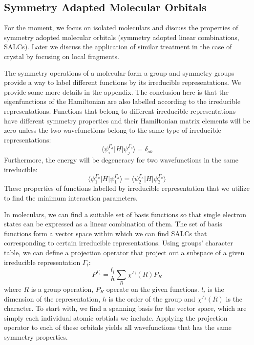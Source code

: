 \documentclass{article}
\begin{document}
\subsection{Symmetry Adapted Molecular Orbitals}
For the moment, we focus on isolated moleculars and discuss the properties of symmetry adopted molecular 
orbitals (symmetry adopted linear combinations, SALCs). Later we discuss the application of similar treatment 
in the case of crystal by focusing on local fragments. 

The symmetry operations of a molecular form a group and symmetry groups provide a way to label different functions 
by its irreducible representations. We provide some more details in the appendix. The conclusion here is 
that the eigenfunctions of the Hamiltonian are also labelled according to the irreducible representations. Functions 
that belong to different irreducible representations have different symmetry properties and their Hamiltonian 
matrix elements will be zero unless the two wavefunctions belong to the same type of irreducible representations:
\begin{equation}
    \langle \psi_i^{\Gamma_a} | H | \psi_j^{\Gamma_b} \rangle = \delta_{ab}
\end{equation}
Furthermore, the energy will be degeneracy for two wavefunctions in the same irreducible:
\begin{equation}
    \langle \psi_1^{\Gamma_a} | H | \psi_1^{\Gamma_a} \rangle = \langle \psi_2^{\Gamma_a} | H | \psi_2^{\Gamma_a} \rangle
\end{equation}
These properties of functions labelled by irreducible representation that we utilize to find the minimum 
interaction parameters. 

In moleculars, we can find a suitable set of basis functions so that single electron states can be 
expressed as a linear combination of them. The set of basis functions form a vector space within which we 
can find SALCs that corresponding to certain irreducible representations. Using groups' character table, 
we can define a projection operator that project out a subspace of a given irreducible representation $\Gamma_i$:
\begin{equation}
    P^{\Gamma_i} = \frac{l_i}{h} \sum_R \chi^{\Gamma_i}(R) P_R
\end{equation}
where $R$ is a group operation, $P_R$ operate on the given functions. 
$l_i$ is the dimension of the representation, $h$ is the order of the group and
$\chi^{\Gamma_i}(R)$ is the character. To start with, we find a spanning basis for the vector space, which 
are simply each individual atomic orbtials we include. Applying the projection operator to each of these 
orbitals yields all wavefunctions that has the same symmetry properties.
\end{document}
